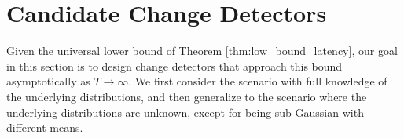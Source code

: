 \documentclass[12pt]{interact}
\newcommand{\lp}{\left(}
\newcommand{\rp}{\right)}
\newcommand{\mcal}{\mathcal}
\newcommand{\mrm}{\mathrm}
\theoremstyle{plain}
\newtheorem{property}{Property}
\newcommand{\vvv}[1]{{\color{red}{#1}}}
\newcommand{\yhh}[1]{{\color{purple}{#1}}}
\begin{document}





\section{Candidate Change Detectors}
\label{sec:CD}

Given the universal lower bound of Theorem \ref{thm:low_bound_latency}, our goal in this section is to design change detectors that approach this bound asymptotically as $T \to \infty$. We first consider the scenario with full knowledge of the underlying distributions, and then generalize to the scenario where the
underlying distributions are unknown, except for being sub-Gaussian with different
means.

\end{document}
